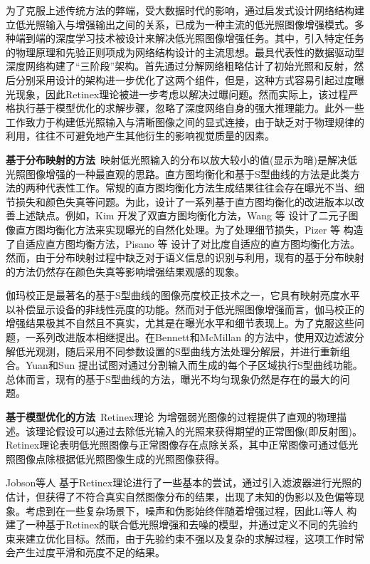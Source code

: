 为了克服上述传统方法的弊端，受大数据时代的影响，通过启发式设计网络结构建立低光照输入与增强输出之间的关系，已成为一种主流的低光照图像增强模式。多种端到端的深度学习技术被设计来解决低光照图像增强任务。其中，引入特定任务的物理原理和先验正则项成为网络结构设计的主流思想。最具代表性的数据驱动型深度网络构建了“三阶段”架构。首先通过分解网络粗略估计了初始光照和反射，然后分别采用设计的架构进一步优化了这两个组件，但是，这种方式容易引起过度曝光现象，因此Retinex理论被进一步考虑以解决过曝问题。然而实际上，该过程严格执行基于模型优化的求解步骤，忽略了深度网络自身的强大推理能力。此外一些工作致力于构建低光照输入与清晰图像之间的显式连接，由于缺乏对于物理规律的利用，往往不可避免地产生其他衍生的影响视觉质量的因素。


\noindent\textbf{基于分布映射的方法}~映射低光照输入的分布以放大较小的值(显示为暗)是解决低光照图像增强的一种最直观的思路。直方图均衡化和基于S型曲线的方法是此类方法的两种代表性工作。常规的直方图均衡化方法生成结果往往会存在曝光不当、细节损失和颜色失真等问题。为此，设计了一系列基于直方图均衡化的改进版本以改善上述缺点。例如，Kim \cite{kim1997contrast} 开发了双直方图均衡化方法，Wang 等 \cite{DBLP:journals/tce/WangCZ99} 设计了二元子图像直方图均衡化方法来实现曝光的自然化处理。为了处理细节损失，Pizer 等 \cite{pizer1987adaptive} 构造了自适应直方图均衡方法，Pisano 等 \cite{DBLP:journals/jdi/PisanoZHDJMBP98}设计了对比度自适应的直方图均衡化方法。然而，由于分布映射过程中缺乏对于语义信息的识别与利用，现有的基于分布映射的方法仍然存在颜色失真等影响增强结果观感的现象。

伽玛校正是最著名的基于S型曲线的图像亮度校正技术之一，它具有映射亮度水平以补偿显示设备的非线性亮度的功能。然而对于低光照图像增强而言，伽马校正的增强结果极其不自然且不真实，尤其是在曝光水平和细节表现上。为了克服这些问题，一系列改进版本相继提出。在Bennett和McMillan \cite{DBLP:journals/tog/BennettM05} 的方法中，使用双边滤波分解低光观测，随后采用不同参数设置的S型曲线方法处理分解层，并进行重新组合。Yuan和Sun \cite{DBLP:conf/eccv/Yuan012}提出试图对通过分割输入而生成的每个子区域执行S型曲线功能。总体而言，现有的基于S型曲线的方法，曝光不均匀现象仍然是存在的最大的问题。

\noindent\textbf{基于模型优化的方法}~Retinex理论 \cite{land1971lightness} 为增强弱光图像的过程提供了直观的物理描述。该理论假设可以通过去除低光输入的光照来获得期望的正常图像(即反射图)。Retinex理论表明低光照图像与正常图像存在点除关系，其中正常图像可通过低光照图像点除根据低光照图像生成的光照图像获得。

Jobson等人 \cite{DBLP:journals/tip/JobsonRW97a} 基于Retinex理论进行了一些基本的尝试，通过引入滤波器进行光照的估计，但获得了不符合真实自然图像分布的结果，出现了未知的伪影以及色偏等现象。考虑到在一些复杂场景下，噪声和伪影始终伴随着增强过程，因此Li等人 \cite{DBLP:journals/tip/LiLYSG18} 构建了一种基于Retinex的联合低光照增强和去噪的模型，并通过定义不同的先验约束来建立优化目标。然而，由于先验约束不强以及复杂的求解过程，这项工作时常会产生过度平滑和亮度不足的结果。

